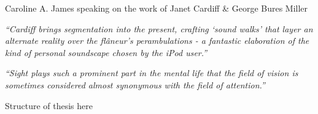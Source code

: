 Caroline A. James speaking on the work of Janet Cardiff \& George Bures Miller

\textit{``Cardiff brings segmentation into the present, crafting `sound walks' that layer an alternate reality over the fl\^aneur's perambulations - a fantastic elaboration of the kind of personal soundscape chosen by the iPod user.''}


\textit{``Sight plays such a prominent part in the mental life that the field of vision is sometimes considered almost synonymous with the field of attention.''}~\cite{Lucas1951}


Structure of thesis here